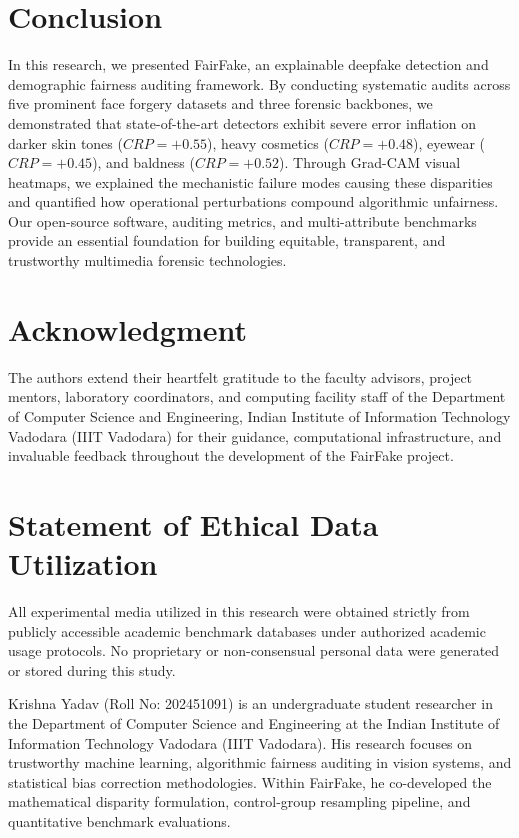 \documentclass[journal]{IEEEtran}
\begin{document}
\section{Conclusion}
\label{sec:conclusion}
In this research, we presented FairFake, an explainable deepfake detection and demographic fairness auditing framework. By conducting systematic audits across five prominent face forgery datasets and three forensic backbones, we demonstrated that state-of-the-art detectors exhibit severe error inflation on darker skin tones ($CRP = +0.55$), heavy cosmetics ($CRP = +0.48$), eyewear ($CRP = +0.45$), and baldness ($CRP = +0.52$). Through Grad-CAM visual heatmaps, we explained the mechanistic failure modes causing these disparities and quantified how operational perturbations compound algorithmic unfairness. Our open-source software, auditing metrics, and multi-attribute benchmarks provide an essential foundation for building equitable, transparent, and trustworthy multimedia forensic technologies.

\section*{Acknowledgment}
The authors extend their heartfelt gratitude to the faculty advisors, project mentors, laboratory coordinators, and computing facility staff of the Department of Computer Science and Engineering, Indian Institute of Information Technology Vadodara (IIIT Vadodara) for their guidance, computational infrastructure, and invaluable feedback throughout the development of the FairFake project.

\section*{Statement of Ethical Data Utilization}
All experimental media utilized in this research were obtained strictly from publicly accessible academic benchmark databases under authorized academic usage protocols. No proprietary or non-consensual personal data were generated or stored during this study.




\begin{IEEEbiographynophoto}{Krishna Yadav}
(Roll No: 202451091) is an undergraduate student researcher in the Department of Computer Science and Engineering at the Indian Institute of Information Technology Vadodara (IIIT Vadodara). His research focuses on trustworthy machine learning, algorithmic fairness auditing in vision systems, and statistical bias correction methodologies. Within FairFake, he co-developed the mathematical disparity formulation, control-group resampling pipeline, and quantitative benchmark evaluations.
\end{IEEEbiographynophoto}
\end{document}
